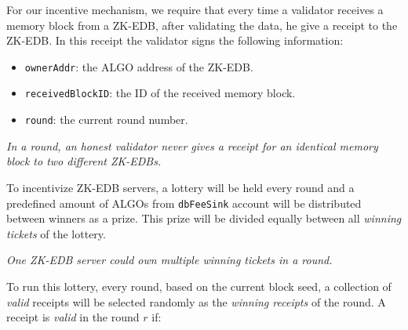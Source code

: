 \documentclass[11pt, A4]{report}
\begin{document}
    For our incentive mechanism, we require that every time a validator receives a memory block from a ZK-EDB, after
    validating the data, he give a receipt to the ZK-EDB. In this receipt the validator signs the following information:

    \begin{itemize}
        \item \texttt{ownerAddr}: the ALGO address of the ZK-EDB\@.
        \item \texttt{receivedBlockID}: the ID of the received memory block.
        \item \texttt{round}: the current round number.
    \end{itemize}

    \emph{In a round, an honest validator never gives a receipt for an identical memory block to two different ZK-EDBs.}

    To incentivize ZK-EDB servers, a lottery will be held every round and a predefined amount of ALGOs from
    \texttt{dbFeeSink} account will be distributed between winners as a prize. This prize will be divided equally
    between all \emph{winning tickets} of the lottery.

    \emph{One ZK-EDB server could own multiple winning tickets in a round.}

    To run this lottery, every round, based on the current block seed, a collection of \emph{valid} receipts will be
    selected randomly as the \emph{winning receipts} of the round. A receipt is \emph{valid} in the round \(r\) if:
\end{document}
